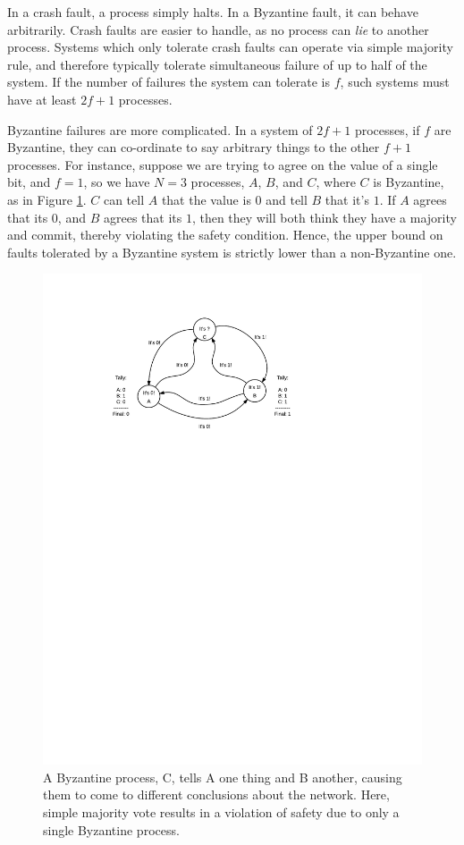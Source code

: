 In a crash fault, a process simply halts. In a Byzantine fault, it can behave arbitrarily.
Crash faults are easier to handle, as no process can \emph{lie} to another process.
Systems which only tolerate crash faults can operate via simple majority rule, 
and therefore typically tolerate simultaneous failure of up to half of the system.
If the number of failures the system can tolerate is $f$, such systems must have at least $2f+1$ processes.

Byzantine failures are more complicated. In a system of $2f+1$ processes, if $f$ are Byzantine, 
they can co-ordinate to say arbitrary things to the other $f+1$ processes.
For instance, suppose we are trying to agree on the value of a single bit, 
and $f=1$, so we have $N=3$ processes, $A$, $B$, and $C$, where $C$ is Byzantine, as in Figure \ref{fig:byzantine}.
$C$ can tell $A$ that the value is $0$ and tell $B$ that it's $1$. 
If $A$ agrees that its $0$, and $B$ agrees that its $1$, then they will both think they have a majority and commit, 
thereby violating the safety condition.
Hence, the upper bound on faults tolerated by a Byzantine system is strictly lower than a non-Byzantine one.

\begin{figure}[]
	\includegraphics[width=\linewidth,height=\textheight,keepaspectratio]{figures/diagrams/byzantine.pdf}
    	\centering
	\caption[Byzantine processes tell lies]{
A Byzantine process, C, tells A one thing and B another, causing them to come to different conclusions about the network.
Here, simple majority vote results in a violation of safety due to only a single Byzantine process.}
	\label{fig:byzantine}
\end{figure}



